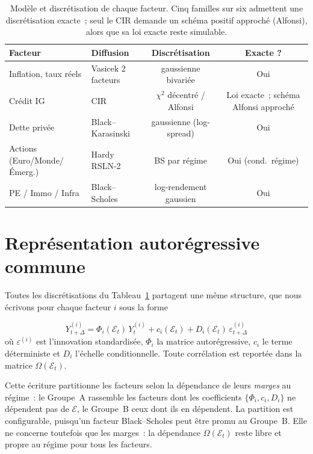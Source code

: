 \documentclass[11pt,a4paper]{article}
\theoremstyle{definition}
\newcommand{\Ecal}{\mathcal{E}}
\newcommand{\eps}{\varepsilon}
\newcommand{\Dt}{\Delta}
\begin{document}
\begin{table}[H]
\centering\small\renewcommand{\arraystretch}{1.25}\setlength{\tabcolsep}{6pt}
\begin{tabularx}{\textwidth}{@{}l l c c@{}}
\toprule
\textbf{Facteur} & \textbf{Diffusion} & \textbf{Discrétisation} & \textbf{Exacte ?}\\
\midrule
\rowcolor{nxlightblue} Inflation, taux réels & Vasicek 2 facteurs & gaussienne bivariée & Oui\\
Crédit IG & CIR & $\chi^2$ décentré / Alfonsi & Loi exacte~; schéma Alfonsi approché\\
\rowcolor{nxlightblue} Dette privée & Black--Karasinski & gaussienne (log-spread) & Oui\\
Actions (Euro/Monde/Émerg.) & Hardy RSLN-2 & BS par régime & Oui (cond.\ régime)\\
\rowcolor{nxlightblue} PE / Immo / Infra & Black--Scholes & log-rendement gaussien & Oui\\
\bottomrule
\end{tabularx}
\caption{Modèle et discrétisation de chaque facteur. Cinq familles sur six admettent une discrétisation exacte~; seul le CIR demande un schéma positif approché (Alfonsi), alors que sa loi exacte reste simulable.}
\label{tab:disc}
\end{table}

\section{Représentation autorégressive commune}
\label{sec:ar}
Toutes les discrétisations du Tableau~\ref{tab:disc} partagent une même structure, que nous écrivons pour chaque facteur $i$ sous la forme
\begin{definitionbox}
\[
\boxed{\;Y^{(i)}_{t+\Dt}=\Phi_i(\Ecal_t)\,Y^{(i)}_t+c_i(\Ecal_t)+D_i(\Ecal_t)\,\eps^{(i)}_{t+\Dt}\;}
\]
où $\eps^{(i)}$ est l'innovation standardisée, $\Phi_i$ la matrice autorégressive, $c_i$ le terme déterministe et $D_i$ l'échelle conditionnelle. Toute corrélation est reportée dans la matrice $\Omega(\Ecal_t)$.
\end{definitionbox}
\noindent Cette écriture partitionne les facteurs selon la dépendance de leurs \emph{marges} au régime~: le Groupe~A rassemble les facteurs dont les coefficients $\{\Phi_i,c_i,D_i\}$ ne dépendent pas de $\Ecal$, le Groupe~B ceux dont ils en dépendent. La partition est configurable, puisqu'un facteur Black--Scholes peut être promu au Groupe~B. Elle ne concerne toutefois que les marges~: la dépendance $\Omega(\Ecal_t)$ reste libre et propre au régime pour tous les facteurs.
\end{document}
